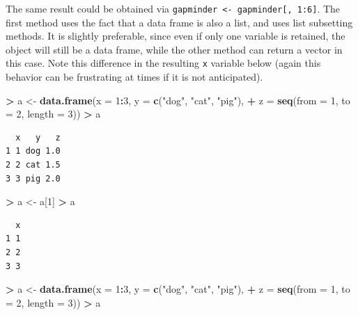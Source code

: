 \documentclass[]{krantz}
\makeatletter
\newenvironment{Shaded}{\begin{snugshade}}{\end{snugshade}}
\newcommand{\KeywordTok}[1]{\textcolor[rgb]{0.27,0.27,0.27}{\textbf{#1}}}
\newcommand{\DataTypeTok}[1]{\textcolor[rgb]{0.27,0.27,0.27}{#1}}
\newcommand{\DecValTok}[1]{\textcolor[rgb]{0.06,0.06,0.06}{#1}}
\newcommand{\StringTok}[1]{\textcolor[rgb]{0.5,0.5,0.5}{#1}}
\newcommand{\OperatorTok}[1]{\textcolor[rgb]{0.43,0.43,0.43}{\textbf{#1}}}
\newcommand{\NormalTok}[1]{#1}
\newenvironment{kframe}{%
\medskip{}
\setlength{\fboxsep}{.8em}
 \def\at@end@of@kframe{}%
 \ifinner\ifhmode%
  \def\at@end@of@kframe{\end{minipage}}%
  \begin{minipage}{\columnwidth}%
 \fi\fi%
 \def\FrameCommand##1{\hskip\@totalleftmargin \hskip-\fboxsep
 \colorbox{shadecolor}{##1}\hskip-\fboxsep
     \hskip-\linewidth \hskip-\@totalleftmargin \hskip\columnwidth}%
 \MakeFramed {\advance\hsize-\width
   \@totalleftmargin\z@ \linewidth\hsize
   \@setminipage}}%
 {\par\unskip\endMakeFramed%
 \at@end@of@kframe}
\renewenvironment{Shaded}{\begin{kframe}}{\end{kframe}}
\makeatother
\begin{document}
The same result could be obtained via
\texttt{gapminder\ \textless{}-\ gapminder{[},\ 1:6{]}}. The first
method uses the fact that a data frame is also a list, and uses list
subsetting methods. It is slightly preferable, since even if only one
variable is retained, the object will still be a data frame, while the
other method can return a vector in this case. Note this difference in
the resulting \texttt{x} variable below (again this behavior can be
frustrating at times if it is not anticipated).

\begin{Shaded}
\begin{Highlighting}[]
\OperatorTok{>}\StringTok{ }\NormalTok{a <-}\StringTok{ }\KeywordTok{data.frame}\NormalTok{(}\DataTypeTok{x =} \DecValTok{1}\OperatorTok{:}\DecValTok{3}\NormalTok{, }\DataTypeTok{y =} \KeywordTok{c}\NormalTok{(}\StringTok{"dog"}\NormalTok{, }\StringTok{"cat"}\NormalTok{, }\StringTok{"pig"}\NormalTok{), }
\OperatorTok{+}\StringTok{                 }\DataTypeTok{z =} \KeywordTok{seq}\NormalTok{(}\DataTypeTok{from =} \DecValTok{1}\NormalTok{, }\DataTypeTok{to =} \DecValTok{2}\NormalTok{, }\DataTypeTok{length =} \DecValTok{3}\NormalTok{))}
\OperatorTok{>}\StringTok{ }\NormalTok{a}
\end{Highlighting}
\end{Shaded}

\begin{verbatim}
  x   y   z
1 1 dog 1.0
2 2 cat 1.5
3 3 pig 2.0
\end{verbatim}

\begin{Shaded}
\begin{Highlighting}[]
\OperatorTok{>}\StringTok{ }\NormalTok{a <-}\StringTok{ }\NormalTok{a[}\DecValTok{1}\NormalTok{]}
\OperatorTok{>}\StringTok{ }\NormalTok{a }
\end{Highlighting}
\end{Shaded}

\begin{verbatim}
  x
1 1
2 2
3 3
\end{verbatim}

\begin{Shaded}
\begin{Highlighting}[]
\OperatorTok{>}\StringTok{ }\NormalTok{a <-}\StringTok{ }\KeywordTok{data.frame}\NormalTok{(}\DataTypeTok{x =} \DecValTok{1}\OperatorTok{:}\DecValTok{3}\NormalTok{, }\DataTypeTok{y =} \KeywordTok{c}\NormalTok{(}\StringTok{"dog"}\NormalTok{, }\StringTok{"cat"}\NormalTok{, }\StringTok{"pig"}\NormalTok{), }
\OperatorTok{+}\StringTok{                 }\DataTypeTok{z =} \KeywordTok{seq}\NormalTok{(}\DataTypeTok{from =} \DecValTok{1}\NormalTok{, }\DataTypeTok{to =} \DecValTok{2}\NormalTok{, }\DataTypeTok{length =} \DecValTok{3}\NormalTok{))}
\OperatorTok{>}\StringTok{ }\NormalTok{a }
\end{Highlighting}
\end{Shaded}
\end{document}
